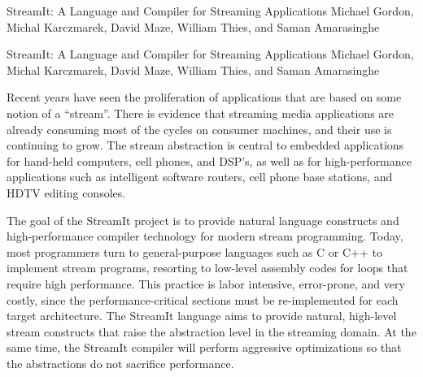 

\formattitle%
  {StreamIt: A Language and Compiler for Streaming Applications}
  {Michael Gordon, Michal Karczmarek, David Maze, William Thies, and
  Saman Amarasinghe}

\formatcontents%
  {StreamIt: A Language and Compiler for Streaming Applications}
  {Michael Gordon, Michal Karczmarek, David Maze, William Thies, and
  Saman Amarasinghe}

%

Recent years have seen the proliferation of applications that are
based on some notion of a ``stream''.  There is evidence that
streaming media applications are already consuming most of the cycles
on consumer machines, and their use is continuing to grow.  The stream
abstraction is central to embedded applications for hand-held
computers, cell phones, and DSP's, as well as for high-performance
applications such as intelligent software routers, cell phone base
stations, and HDTV editing consoles.

The goal of the StreamIt project is to provide natural language
constructs and high-performance compiler technology for modern stream
programming.  Today, most programmers turn to general-purpose
languages such as C or C++ to implement stream programs, resorting to
low-level assembly codes for loops that require high performance.
This practice is labor intensive, error-prone, and very costly, since
the performance-critical sections must be re-implemented for each
target architecture.  The StreamIt language aims to provide natural,
high-level stream constructs that raise the abstraction level in the
streaming domain.  At the same time, the StreamIt compiler will
perform aggressive optimizations so that the abstractions do not
sacrifice performance.

